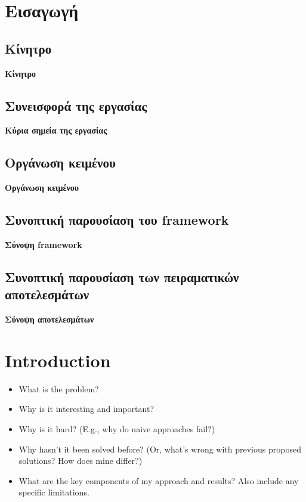 
\chapter{Εισαγωγή}

\section{Κίνητρο}
  {\color{red}\textbf{Κίνητρο}}

\section{Συνεισφορά της εργασίας}
  {\color{red}\textbf{Κύρια σημεία της εργασίας}}

\section{Οργάνωση κειμένου}
  {\color{red}\textbf{Οργάνωση κειμένου}}

\section{Συνοπτική παρουσίαση του framework}
  {\color{red}\textbf{Σύνοψη framework}}

\section{Συνοπτική παρουσίαση των πειραματικών αποτελεσμάτων}
  {\color{red}\textbf{Σύνοψη αποτελεσμάτων}}

\setcounter{chapter}{0}

\chapter{Introduction}

\begin{itemize}
\item What is the problem?
\item Why is it interesting and important?
\item Why is it hard? (E.g., why do naive approaches fail?)
\item Why hasn't it been solved before? (Or, what's wrong with previous proposed solutions? How does mine differ?)
\item What are the key components of my approach and results? Also include any specific limitations.
\end{itemize}

